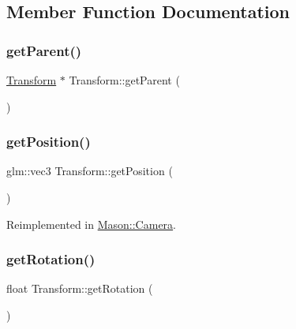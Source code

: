 \subsection{Member Function Documentation}
\hypertarget{class_mason_1_1_transform_ae3e8acbd25d7d171aff00da038f79a9a}{}\label{class_mason_1_1_transform_ae3e8acbd25d7d171aff00da038f79a9a} 
\subsubsection{\texorpdfstring{get\+Parent()}{getParent()}}
{\footnotesize\ttfamily \hyperlink{class_mason_1_1_transform}{Transform} $\ast$ Transform\+::get\+Parent (\begin{DoxyParamCaption}{ }\end{DoxyParamCaption})\hspace{0.3cm}{\ttfamily [virtual]}}

\hypertarget{class_mason_1_1_transform_a0b21f641e72d7b55f3a630b986d0b106}{}\label{class_mason_1_1_transform_a0b21f641e72d7b55f3a630b986d0b106} 
\subsubsection{\texorpdfstring{get\+Position()}{getPosition()}}
{\footnotesize\ttfamily glm\+::vec3 Transform\+::get\+Position (\begin{DoxyParamCaption}{ }\end{DoxyParamCaption})\hspace{0.3cm}{\ttfamily [virtual]}}



Reimplemented in \hyperlink{class_mason_1_1_camera_a71560b8b6216a542ae1958bd91a4361d}{Mason\+::\+Camera}.

\hypertarget{class_mason_1_1_transform_ab15164f1690929c45e636514c0dafb7f}{}\label{class_mason_1_1_transform_ab15164f1690929c45e636514c0dafb7f} 
\subsubsection{\texorpdfstring{get\+Rotation()}{getRotation()}}
{\footnotesize\ttfamily float Transform\+::get\+Rotation (\begin{DoxyParamCaption}{ }\end{DoxyParamCaption})\hspace{0.3cm}{\ttfamily [virtual]}}

